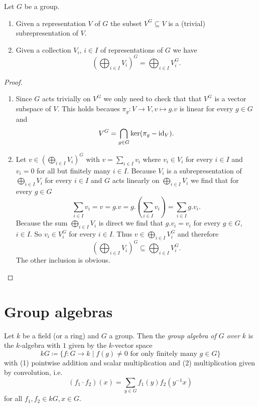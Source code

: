 \begin{lem}\label{lem: direct sum and invariants commute}
  Let $G$ be a group.
  \begin{enumerate}[label=\emph{\alph*)},leftmargin=*]
    \item
      Given a representation $V$ of $G$ the subset $V^G \subseteq V$ is a (trivial) subrepresentation of $V$.
    \item
      Given a collection $V_i$, $i \in I$ of representations of $G$ we have
      \[
        \left( \bigoplus_{i \in I} V_i \right)^G = \bigoplus_{i \in I} V_i^G.
      \]
  \end{enumerate}
\end{lem}
\begin{proof}
  \begin{enumerate}[label=\emph{\alph*)},leftmargin=*]
    \item
      Since $G$ acts trivially on $V^G$ we only need to check that that $V^G$ is a vector subspace of $V$. This holds becaues $\pi_g \colon V \to V, v \mapsto g.v$ is linear for every $g \in G$ and
      \[
        V^G = \bigcap_{g \in G} \ker(\pi_g - \operatorname{id}_V).
      \]
    \item
      Let $v \in \left( \bigoplus_{i \in I} V_i \right)^G$ with $v = \sum_{i \in I} v_i$ where $v_i \in V_i$ for every $i \in I$ and $v_i = 0$ for all but finitely many $i \in I$. Because $V_i$ is a subrepresentation of $\bigoplus_{i \in I} V_i$ for every $i \in I$ and $G$ acts linearly on $\bigoplus_{i \in I} V_i$ we find that for every $g \in G$
      \[
        \sum_{i \in I} v_i
        = v
        = g.v
        = g.\left( \sum_{i \in I} v_i \right)
        = \sum_{i \in I} g.v_i.
      \]
      Because the sum $\bigoplus_{i \in I} V_i$ is direct we find that $g.v_i = v_i$ for every $g \in G$, $i \in I$. So $v_i \in V_i^G$ for every $i \in I$. Thus $v \in \bigoplus_{i \in I} V_i^G$ and therefore
      \[
        \left( \bigoplus_{i \in I} V_i \right)^G \subseteq \bigoplus_{i \in I} V_i^G.
      \]
      The other inclusion is obvious.
  \end{enumerate}
\end{proof}





\section{Group algebras}


\begin{defi}
  Let $k$ be a field (or a ring) and $G$ a group. Then the \emph{group algebra of $G$ over $k$} is the $k$-algebra with $1$ given by the $k$-vector space
  \[
    kG \coloneqq \{f \colon G \to k \mid f(g) \neq 0 \text{ for only finitely many } g \in G\}
  \]
  with (1) pointwise addition and scalar multiplication and (2) multiplication given by convolution, i.e.\
  \[
    (f_1 \cdot f_2)(x) = \sum_{y \in G} f_1(y) f_2\left(y^{-1}x\right)
  \]
  for all $f_1, f_2 \in kG, x \in G$.
\end{defi}

